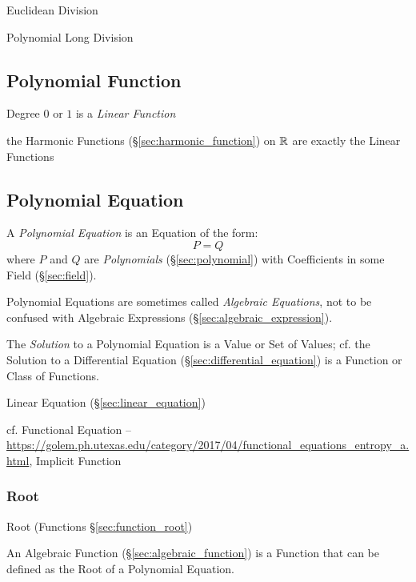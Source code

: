 Euclidean Division

Polynomial Long Division



\subsection{Polynomial Function}\label{sec:polynomial_function}

Degree $0$ or $1$ is a \emph{Linear Function}

the Harmonic Functions (\S\ref{sec:harmonic_function}) on $\mathbb{R}$ are
exactly the Linear Functions



\subsection{Polynomial Equation}\label{sec:polynomial_equation}

A \emph{Polynomial Equation} is an Equation of the form:
\[
  P = Q
\]
where $P$ and $Q$ are \emph{Polynomials} (\S\ref{sec:polynomial}) with
Coefficients in some Field (\S\ref{sec:field}).

\fist Polynomial Equations are sometimes called \emph{Algebraic Equations}, not
to be confused with Algebraic Expressions (\S\ref{sec:algebraic_expression}).

The \emph{Solution} to a Polynomial Equation is a Value or Set of Values; cf.
the Solution to a Differential Equation (\S\ref{sec:differential_equation}) is
a Function or Class of Functions.

Linear Equation (\S\ref{sec:linear_equation})

cf. Functional Equation --
\url{https://golem.ph.utexas.edu/category/2017/04/functional_equations_entropy_a.html},
Implicit Function %



\subsubsection{Root}\label{sec:equation_root}

\fist Root (Functions \S\ref{sec:function_root})

An Algebraic Function (\S\ref{sec:algebraic_function}) is a Function that can
be defined as the Root of a Polynomial Equation.



